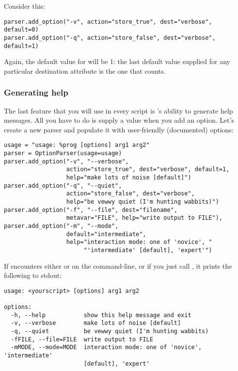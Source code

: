Consider this:

\begin{verbatim}
parser.add_option("-v", action="store_true", dest="verbose", default=0)
parser.add_option("-q", action="store_false", dest="verbose", default=1)
\end{verbatim}

Again, the default value for  will be 1: the last
default value supplied for any particular destination attribute is the
one that counts.

\subsubsection{Generating help\label{optparse-generating-help}}

The last feature that you will use in every script is
's ability to generate help messages.  All you have
to do is supply a  value when you add an option.  Let's
create a new parser and populate it with user-friendly (documented)
options:

\begin{verbatim}
usage = "usage: %prog [options] arg1 arg2"
parser = OptionParser(usage=usage)
parser.add_option("-v", "--verbose",
                  action="store_true", dest="verbose", default=1,
                  help="make lots of noise [default]")
parser.add_option("-q", "--quiet",
                  action="store_false", dest="verbose", 
                  help="be vewwy quiet (I'm hunting wabbits)")
parser.add_option("-f", "--file", dest="filename",
                  metavar="FILE", help="write output to FILE"),
parser.add_option("-m", "--mode",
                  default="intermediate",
                  help="interaction mode: one of 'novice', "
                       "'intermediate' [default], 'expert'")
\end{verbatim}

If  encounters either  or
 on the command-line, or if you just call
, it prints the following to stdout:

\begin{verbatim}
usage: <yourscript> [options] arg1 arg2

options:
  -h, --help           show this help message and exit
  -v, --verbose        make lots of noise [default]
  -q, --quiet          be vewwy quiet (I'm hunting wabbits)
  -fFILE, --file=FILE  write output to FILE
  -mMODE, --mode=MODE  interaction mode: one of 'novice', 'intermediate'
                       [default], 'expert'
\end{verbatim}

